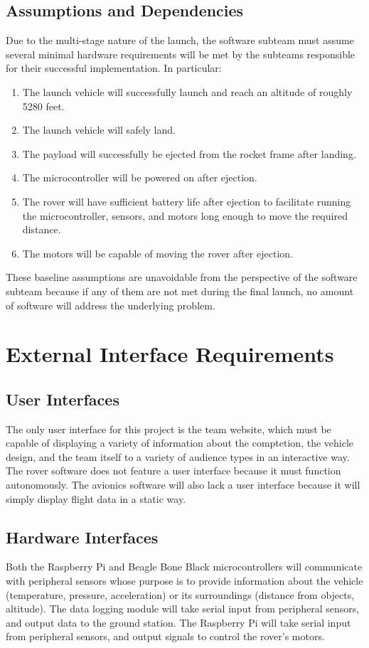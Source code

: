 \documentclass[onecolumn, draftclsnofoot, 10pt, compsoc]{IEEEtran}
\begin{document}
\subsection{Assumptions and Dependencies}
Due to the multi-stage nature of the launch, the software subteam must assume several minimal hardware requirements will be met by the subteams responsible for their successful implementation. In particular:
\begin{enumerate}
\item The launch vehicle will successfully launch and reach an altitude of roughly 5280 feet.
\item The launch vehicle will safely land.
\item The payload will successfully be ejected from the rocket frame after landing.
\item The microcontroller will be powered on after ejection.
\item The rover will have sufficient battery life after ejection to facilitate running the microcontroller, sensors, and motors long enough to move the required distance.
\item The motors will be capable of moving the rover after ejection.
\end{enumerate}

These baseline assumptions are unavoidable from the perspective of the software subteam because if any of them are not met during the final launch, no amount of software will address the underlying problem.

\section{External Interface Requirements}

\subsection{User Interfaces}
The only user interface for this project is the team website, which must be capable of displaying a variety of information about the comptetion, the vehicle design, and the team itself to a variety of audience types in an interactive way. The rover software does not feature a user interface because it must function autonomously. The avionics software will also lack a user interface because it will simply display flight data in a static way.

\subsection{Hardware Interfaces}
Both the Raspberry Pi and Beagle Bone Black microcontrollers will communicate with peripheral sensors whose purpose is to provide information about the vehicle (temperature, pressure, acceleration) or its surroundings (distance from objects, altitude). The data logging module will take serial input from peripheral sensors, and output data to the ground station. The Raspberry Pi will take serial input from peripheral sensors, and output signals to control the rover's motors.
\end{document}
